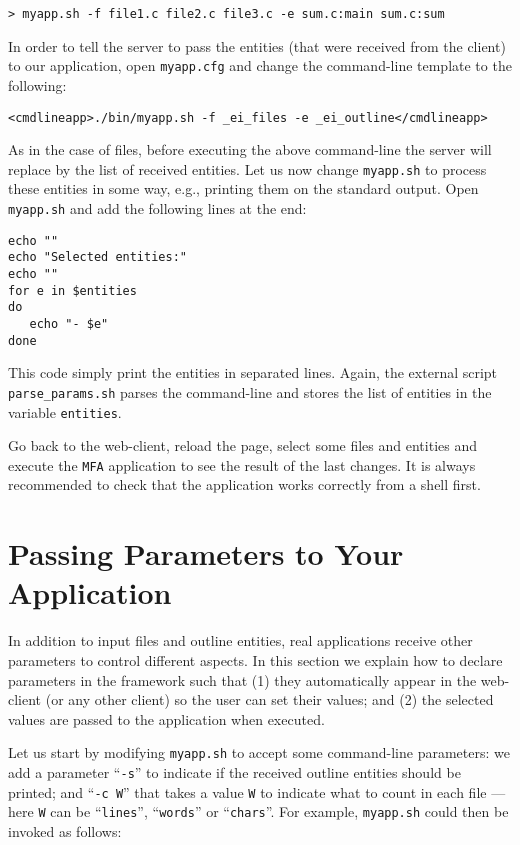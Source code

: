 \medskip
\begin{lstlisting}
> myapp.sh -f file1.c file2.c file3.c -e sum.c:main sum.c:sum
\end{lstlisting}

\medskip 
\noindent
In order to tell the server to pass the entities (that were received
from the client) to our application, open \texttt{myapp.cfg} and
change the command-line template to the following:

\medskip
\begin{lstlisting}
<cmdlineapp>./bin/myapp.sh -f _ei_files -e _ei_outline</cmdlineapp>
\end{lstlisting}

\medskip
\noindent
As in the case of files, before executing the above command-line the
server will replace  by the list of received
entities.  Let us now change \texttt{myapp.sh} to process these
entities in some way, e.g., printing them on the standard output. Open
\texttt{myapp.sh} and add the following lines at the end:

\medskip
\begin{lstlisting}[style=script]
echo ""
echo "Selected entities:"
echo ""
for e in $entities 
do
   echo "- $e"
done
\end{lstlisting}

\medskip
\noindent
This code simply print the entities in separated lines. Again, the
external script \texttt{parse\_params.sh} parses the command-line and
stores the list of entities in the variable \texttt{entities}.

Go back to the web-client, reload the page, select some files and
entities and execute the \texttt{MFA} application to see the result of
the last changes. It is always recommended to check that the
application works correctly from a shell first.

\section{Passing Parameters to Your Application}

In addition to input files and outline entities, real applications
receive other parameters to control different aspects. In this section
we explain how to declare parameters in the \ei framework such that
(1) they automatically appear in the web-client (or any other client)
so the user can set their values; and (2) the selected values are
passed to the application when executed.

Let us start by modifying \texttt{myapp.sh} to accept some
command-line parameters: we add a parameter ``\texttt{-s}'' to
indicate if the received outline entities should be printed; and
``\texttt{-c W}'' that takes a value \texttt{W} to indicate what to
count in each file --- here \texttt{W} can be ``\texttt{lines}'',
``\texttt{words}'' or ``\texttt{chars}''.
%
For example, \texttt{myapp.sh} could then be invoked as follows:



